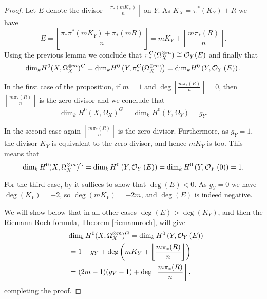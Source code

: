 \begin{proof}

Let $E$ denote the divisor $\left\lfloor \frac{\pi_*(mK_X)}{n} \right\rfloor$ on $Y$. As $K_X=\pi^*(K_Y)+R$ we have
\[ E = 
\left \lfloor \frac{\pi_*\pi^*(mK_Y) + \pi_*(mR)}{n} \right \rfloor =
mK_Y + \left \lfloor \frac{m\pi_*(R)}{n} \right \rfloor.\]
Using the previous lemma we conclude that $\pi_*^G(\Omega_X^{\otimes m}) \cong {\cal O}_Y (E)$ and finally that
\begin{equation*}
\textrm{dim}_k H^0(X,\Omega_X^{\otimes m})^G 
= \textrm{dim}_k H^0\left(Y, \pi_*^G(\Omega_X^{\otimes m})\right)
= \textrm{dim}_k H^0\left(Y, {\cal O}_Y\left( E \right) \right).
\end{equation*}


In the first case of the proposition, \ie if $m=1$ and $\deg \left\lfloor\frac{m\pi_*(R)}{n} \right\rfloor=0$, then $\left\lfloor\frac{m\pi_*(R)}{n} \right\rfloor$ is the zero divisor and we conclude that 
\begin{equation*}
\dim_kH^0(X,\Omega_X)^G = \dim_kH^0(Y, \Omega_Y) = g_Y.
\end{equation*}


In the second case again $\left\lfloor \frac{m\pi_*(R)}{n} \right\rfloor$ is the zero divisor. 
Furthermore, as $g_Y=1$, the divisor $K_Y$ is equivalent to the zero divisor, and hence $mK_Y$ is too. 
This means that
\begin{equation*}
\dim_kH^0(X,\Omega_X^{\otimes m})^G = \dim_kH^0\left( Y,{\cal O}_Y\left( E \right) \right) 
= \dim_k  H^0\left( Y,{\cal O}_Y\left( 0 \right) \right)
= 1.
\end{equation*}


For the third case, by \cite[Chap. IV, ex. 1.3.4]{hart} it suffices to show that $\deg \left( E \right) < 0$.
As $g_Y=0$ we have $\deg(K_Y)=-2$, so $\deg(mK_Y)=-2m$, and $\deg \left( E \right)$ is indeed negative.



We will show below that in all other cases $\deg(E) > \deg(K_Y)$, and then the Riemann-Roch formula, Theorem \ref{riemannroch}, will give 
\begin{align*}
\lefteqn{\dim_kH^0(X,\Omega_X^{\otimes m})^G = \dim_kH^0\left(Y,\cO_Y\left( E \right)\right)} \\
& =  1-g_Y+\deg\left(mK_Y+\left\lfloor{\frac{m\pi_*(R)}{n}}\right\rfloor\right) \\
& =  (2m-1)(g_Y-1)+\deg\left\lfloor{\frac{m\pi_*(R)}{n}}\right\rfloor,
\end{align*}
completing the proof.



\end{proof}
